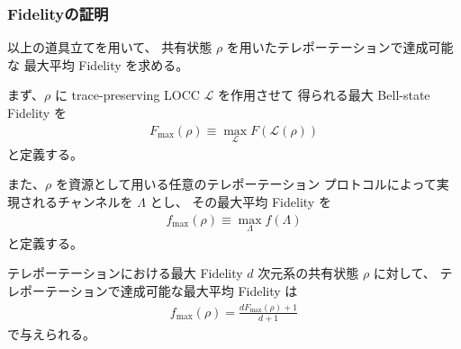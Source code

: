 \documentclass[a4paper,10.5pt]{article}
\numberwithin{equation}{section}
\begin{document}
\subsubsection{Fidelityの証明}
以上の道具立てを用いて、
共有状態 $\rho$ を用いたテレポーテーションで達成可能な
最大平均 Fidelity を求める。

まず、$\rho$ に trace-preserving LOCC $\mathcal{L}$ を作用させて
得られる最大 Bell-state Fidelity を
\begin{align*}
    F_{\max}(\rho)
    \equiv
    \max_{\mathcal{L}}
    F(\mathcal{L}(\rho))
\end{align*}
と定義する。

また、$\rho$ を資源として用いる任意のテレポーテーション
プロトコルによって実現されるチャンネルを $\Lambda$ とし、
その最大平均 Fidelity を
\begin{align*}
    f_{\max}(\rho)
    \equiv
    \max_{\Lambda}f(\Lambda)
\end{align*}
と定義する。

\begin{theorembox}{テレポーテーションにおける最大 Fidelity}
$d$ 次元系の共有状態 $\rho$ に対して、
テレポーテーションで達成可能な最大平均 Fidelity は
\begin{align*}
    \boxed{
    f_{\max}(\rho)
    =
    \frac{dF_{\max}(\rho)+1}{d+1}
    }
\end{align*}
で与えられる。
\end{theorembox}
\end{document}
